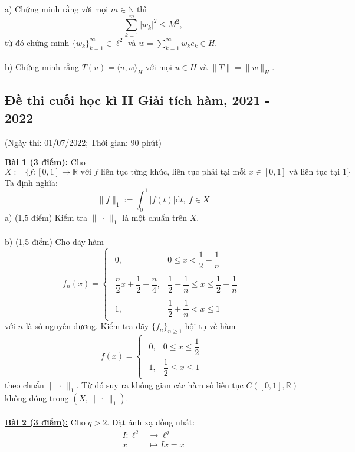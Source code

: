 \documentclass[10pt, a4paper]{article}
\begin{document}
\color{red}a) \color{black}Chứng minh rằng với mọi $m\in\mathbb N$ thì $$\displaystyle\sum_{k=1}^m|w_k|^2\le M^2,$$
từ đó chứng minh $\{w_k\}_{k=1}^\infty\in\ell^2$ và $w=\displaystyle\sum_{k=1}^\infty w_ke_k\in H$.\\\\
\color{red}b) \color{black}Chứng minh rằng $T(u)=\langle u,w\rangle_H$ với mọi $u\in H$ và $\lVert T\rVert=\lVert w\rVert_H$.

\newpage

\subsection{Đề thi cuối học kì II Giải tích hàm, 2021 - 2022}
\begin{center}
	\color{blue}(Ngày thi: 01/07/2022; Thời gian: 90 phút)
\end{center}
\color{red}\underline{\textbf{Bài 1 (3 điểm):}} \color{black}Cho $$X:=\{f:[0,1]\rightarrow\mathbb R\text{ với $f$ liên tục từng khúc, liên tục phải tại mỗi $x\in[0,1]$ và liên tục tại 1}\}$$
Ta định nghĩa: $$\lVert f\rVert_1:=\displaystyle\int_0^1|f(t)|\text{d}t,~f\in X$$
\color{red}a) (1,5 điểm) \color{black}Kiểm tra $\lVert~\cdot~\rVert_1$ là một chuẩn trên $X$.\\\\
\color{red}b) (1,5 điểm) \color{black}Cho dãy hàm $$f_n(x)=\begin{cases}
\begin{array}{ll}
	0, & 0\le x<\dfrac12-\dfrac1n\\\\
	\dfrac n2x+\dfrac12-\dfrac n4, & \dfrac12-\dfrac1n\le x\le\dfrac12+\dfrac1n\\\\
	1, & \dfrac12+\dfrac1n<x\le1
\end{array}
\end{cases}$$
với $n$ là số nguyên dương. Kiểm tra dãy $\{f_n\}_{n\ge1}$ hội tụ về hàm $$f(x)=\begin{cases}
\begin{array}{ll}
	0, & 0\le x\le\dfrac12\\
	1, & \dfrac12\le x\le1
\end{array}
\end{cases}$$
theo chuẩn $\lVert~\cdot~\rVert_1$. Từ đó suy ra không gian các hàm số liên tục $C([0,1],\mathbb R)$ không đóng trong $(X,\lVert~\cdot~\rVert_1)$.\\\\
\color{red}\underline{\textbf{Bài 2 (3 điểm):}} \color{black}Cho $q>2$. Đặt ánh xạ đồng nhất:\begin{align*}
	I:\ell^2&\rightarrow\ell^q\\
	x&\mapsto Ix=x
\end{align*}
\end{document}
